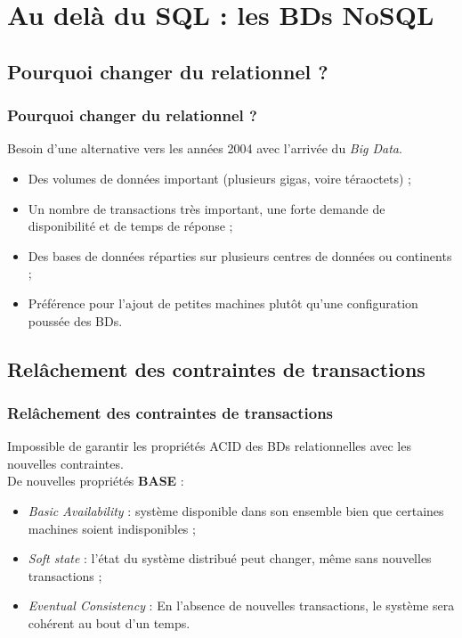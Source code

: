\section{Au delà du SQL : les BDs NoSQL}

	\subsection{Pourquoi changer du relationnel ?}
	\begin{frame}
		\frametitle{Pourquoi changer du relationnel ?}

		Besoin d'une alternative vers les années 2004 avec l'arrivée du \textit{Big Data}.
		\begin{itemize}
			\item Des volumes de données important (plusieurs gigas, voire téraoctets) ;
			\item Un nombre de transactions très important, une forte demande de disponibilité et de temps de réponse ;
			\item Des bases de données réparties sur plusieurs centres de données ou continents ;
			\item Préférence pour l'ajout de petites machines plutôt qu'une configuration poussée des BDs.
		\end{itemize}

	\end{frame}

	\subsection{Relâchement des contraintes de transactions}
	\begin{frame}
		\frametitle{Relâchement des contraintes de transactions}

		Impossible de garantir les propriétés ACID des BDs relationnelles avec les nouvelles contraintes.\\
		\vspace{10px}
		De nouvelles propriétés \textbf{BASE} :
		\begin{itemize}
			\item \textit{Basic Availability} : système disponible dans son ensemble bien que certaines machines soient indisponibles ;
			\item \textit{Soft state} : l'état du système distribué peut changer, même sans nouvelles transactions ;
			\item \textit{Eventual Consistency} : En l'absence de nouvelles transactions, le système sera cohérent au bout d'un temps.
		\end{itemize}

	\end{frame}

